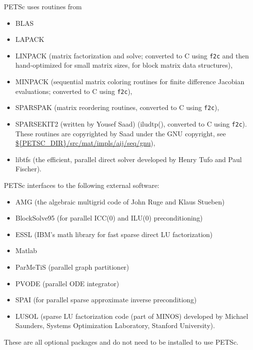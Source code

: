 \vspace{.3in}
\noindent
PETSc uses routines from 
\begin{itemize}
  \item BLAS
  \item LAPACK
  \item LINPACK      (matrix factorization and solve; converted to C using {\tt f2c} and then 
                      hand-optimized for small matrix sizes, for block matrix data structures),
  \item MINPACK      (sequential matrix coloring routines for finite difference Jacobian
                       evaluations; converted to C using {\tt f2c}),
  \item SPARSPAK     (matrix reordering routines, converted to C using {\tt f2c}),
  \item SPARSEKIT2 (written by Yousef Saad) (iludtp(), converted to C using {\tt f2c}). These routines 
                     are copyrighted by Saad under the GNU copyright, see \url{${PETSC_DIR}/src/mat/impls/aij/seq/gnu}),
  \item libtfs (the efficient, parallel direct solver developed by Henry Tufo and Paul Fischer).
\end{itemize}


\vspace{.3in}
\noindent
PETSc interfaces to the following external software:
\begin{itemize}
  \item AMG          (the algebraic multigrid code of John Ruge and Klaus Stueben)
  \item BlockSolve95 (for parallel ICC(0) and ILU(0) preconditioning)
  \item ESSL         (IBM's math library for fast sparse direct LU factorization)
  \item Matlab       
  \item ParMeTiS      (parallel graph partitioner)
  \item PVODE        (parallel ODE integrator)
  \item SPAI         (for parallel sparse approximate inverse preconditiong)
  \item LUSOL        (sparse LU factorization code (part of MINOS) developed by Michael Saunders,
                      Systems Optimization Laboratory, Stanford University).
\end{itemize}
These are all optional packages and do not need to be installed to use PETSc.


